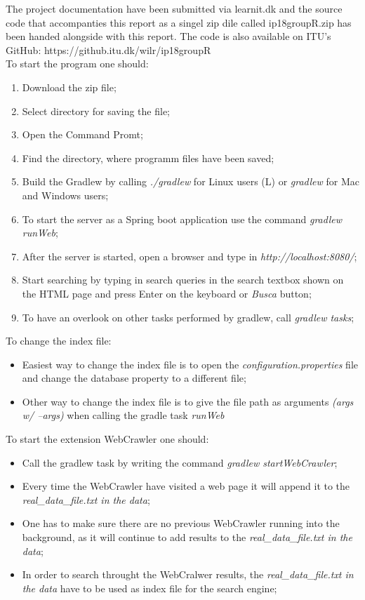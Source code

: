 The project documentation have been submitted via learnit.dk and the source code that accompanties this report as a singel zip dile called ip18groupR.zip has been handed alongside with this report.
The code is also available on ITU's GitHub: https://github.itu.dk/wilr/ip18groupR\\
To start the program one should:
\begin{enumerate}
    \item Download the zip file;
    \item Select directory for saving the file;
    \item Open the Command Promt;
    \item Find the directory, where programm files have been saved;
    \item Build the Gradlew by calling  \textit{./gradlew} for Linux users (L) or \textit{gradlew} for Mac and Windows users;
    \item To start the server as a  Spring boot application use the command \textit{gradlew runWeb};
    \item After the server is started, open a browser and type in \textit{http://localhost:8080/};
    \item Start searching by typing in search queries in the search textbox shown on the HTML page and press Enter on the keyboard or \textit{Busca} button;
    \item To have an overlook on other tasks performed by gradlew, call \textit{gradlew tasks};
\end{enumerate}

To change the index file:
\begin{itemize}
    \item Easiest way to change the index file is to open the \textit{configuration.properties} file and change the database property to a different file;
    \item Other way to change the index file is to give the file path as arguments \textit{(args w/ --args)} when calling the gradle task \textit{runWeb}
\end{itemize}

To start the extension WebCrawler one should:
\begin{itemize}

    \item Call the gradlew task by writing the command  \textit{gradlew startWebCrawler};
    \item Every time the WebCrawler have visited a web page it will append it to the \textit{real\_data\_file.txt in the data};
\item One has to make sure there are no previous WebCrawler running into the background, as it will continue to add results to the \textit{real\_data\_file.txt in the data};
\item In order to search throught the WebCralwer results, the \textit{real\_data\_file.txt in the data} have to be used as index file for the search engine;

\end{itemize}

